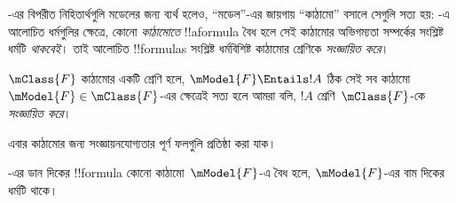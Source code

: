 \documentclass[../../../include/open-logic-section]{subfiles}
\begin{document}


-এর বিপরীত নিহিতার্থগুলি মডেলের জন্য ব্যর্থ হলেও, ``মডেল''-এর জায়গায় ``কাঠামো'' বসালে সেগুলি সত্য হয়: -এ আলোচিত ধর্মগুলির ক্ষেত্রে, কোনো \emph{কাঠামোতে} !!a{formula} বৈধ হলে সেই কাঠামোর অভিগম্যতা সম্পর্কের সংশ্লিষ্ট ধর্মটি \emph{থাকবেই}। তাই আলোচিত !!{formula}s সংশ্লিষ্ট ধর্মবিশিষ্ট কাঠামোর শ্রেণিকে \emph{সংজ্ঞায়িত করে}।

\begin{defn}
  $\mClass{F}$ কাঠামোর একটি শ্রেণি হলে, $\mModel{F} \Entails !A$ ঠিক সেই সব কাঠামো~$\mModel{F} \in \mClass{F}$-এর ক্ষেত্রেই সত্য হলে আমরা বলি, $!A$ শ্রেণি~$\mClass{F}$-কে \emph{সংজ্ঞায়িত করে}।
\end{defn}

এবার কাঠামোর জন্য সংজ্ঞায়নযোগ্যতার পূর্ণ ফলগুলি প্রতিষ্ঠা করা যাক।

\begin{thm}
-এর ডান দিকের !!{formula} কোনো কাঠামো~$\mModel{F}$-এ বৈধ হলে, $\mModel{F}$-এর বাম দিকের ধর্মটি থাকে।
\end{thm}
\end{document}
